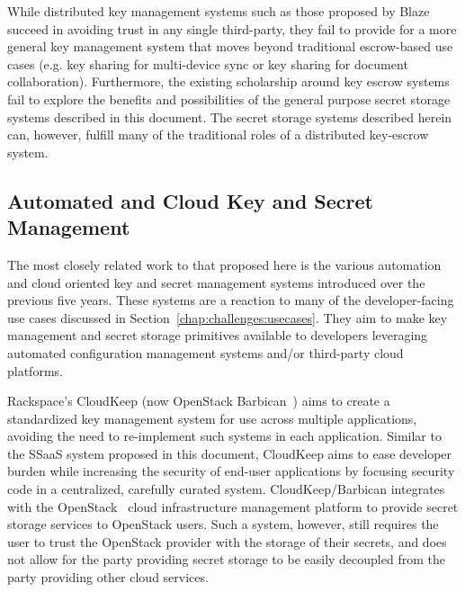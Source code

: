 While distributed key management systems such as those proposed by
Blaze succeed in avoiding trust in any single third-party, they fail
to provide for a more general key management system that moves beyond
traditional escrow-based use cases (e.g. key sharing for multi-device
sync or key sharing for document collaboration). Furthermore, the
existing scholarship around key escrow systems fail to explore the
benefits and possibilities of the general purpose secret storage
systems described in this document. The secret storage systems
described herein can, however, fulfill many of the traditional roles
of a distributed key-escrow system.

\subsection{Automated and Cloud Key and Secret Management}

The most closely related work to that proposed here is the various
automation and cloud oriented key and secret management systems
introduced over the previous five years. These systems are a reaction
to many of the developer-facing use cases discussed in
Section~\ref{chap:challenges:usecases}. They aim to make key
management and secret storage primitives available to developers
leveraging automated configuration management systems and/or
third-party cloud platforms.

Rackspace's CloudKeep\cite{cloudkeep-presentation, cloudkeep} (now
OpenStack Barbican~\cite{openstack-barbican}) aims to create a
standardized key management system for use across multiple
applications, avoiding the need to re-implement such systems in each
application. Similar to the SSaaS system proposed in this document,
CloudKeep aims to ease developer burden while increasing the security
of end-user applications by focusing security code in a centralized,
carefully curated system. CloudKeep/Barbican integrates with the
OpenStack~\cite{openstack} cloud infrastructure management platform to
provide secret storage services to OpenStack users. Such a system,
however, still requires the user to trust the OpenStack provider with
the storage of their secrets, and does not allow for the party
providing secret storage to be easily decoupled from the party
providing other cloud services.

